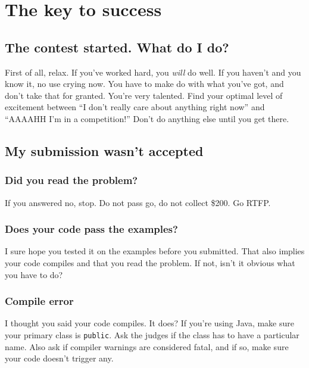 \documentclass[a4paper,12pt]{article}
\begin{document}
\newpage\section{The key to success}

\subsection{The contest started. What do I do?}
First of all, relax. If you've worked hard, you {\em will} do well. If you haven't and you know it, no use crying now. You have to make do with what you've got, and don't take that for granted. You're very talented. Find your optimal level of excitement between ``I don't really care about anything right now'' and ``AAAAHH I'm in a competition!'' Don't do anything else until you get there. 

\subsection{My submission wasn't accepted}

\subsubsection{Did you read the problem?}
If you answered no, stop. Do not pass go, do not collect \$200. Go RTFP.

\subsubsection{Does your code pass the examples?}
I sure hope you tested it on the examples before you submitted. That also implies your code compiles and that you read the problem. If not, isn't it obvious what you have to do?

\subsubsection{Compile error}
I thought you said your code compiles. It does? If you're using Java, make sure your primary class is \verb/public/. Ask the judges if the class has to have a particular name. Also ask if compiler warnings are considered fatal, and if so, make sure your code doesn't trigger any.
\end{document}

